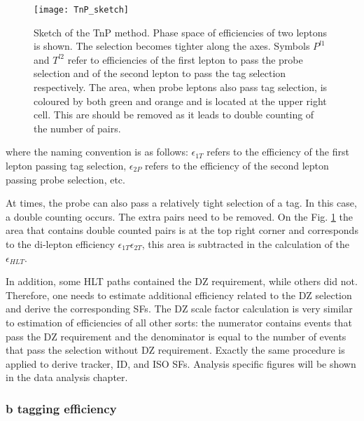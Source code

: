  \begin{figure}[H]
  \centering
  \texttt{[image: TnP\_sketch]}
  \caption[Sketch of the TnP method.]{Sketch of the TnP method. Phase space of efficiencies of two leptons is shown. The selection becomes tighter along the axes. Symbols $P^{l1}$ and $T^{l2}$ refer to efficiencies of the first lepton to pass the probe selection and of the second lepton to pass the tag selection respectively. The area, when probe leptons also pass tag selection, is coloured by both green and orange and is located at the upper right cell. This are should be removed as it leads to double counting of the number of pairs.}
  \label{TnP_sketch}
\end{figure}

\noindent where the naming convention is as follows: $\epsilon_{1T}$ refers to the efficiency of the first lepton passing tag selection, $\epsilon_{2P}$ refers to the efficiency of the second lepton passing probe selection, etc. 

At times, the probe can also pass a relatively tight selection of a tag. In this case, a double counting occurs. The extra pairs need to be removed. On the Fig. \ref{TnP_sketch} the area that contains double counted pairs is at the top right corner and corresponds to the di-lepton efficiency $\epsilon_{1T}\epsilon_{2T}$, this area is subtracted in the calculation of the $\epsilon_{HLT}$.

In addition, some HLT paths contained the DZ requirement, while others did not. Therefore, one needs to estimate additional efficiency related to the DZ selection and derive the corresponding SFs. The DZ scale factor calculation is very similar to estimation of efficiencies of all other sorts: the numerator contains events that pass the DZ requirement and the denominator is equal to the number of events that pass the selection without DZ requirement. Exactly the same procedure is applied to derive tracker, ID, and ISO SFs. Analysis specific figures will be shown in the data analysis chapter. 

\subsubsection{b tagging efficiency}\label{sec:b_tagging}

